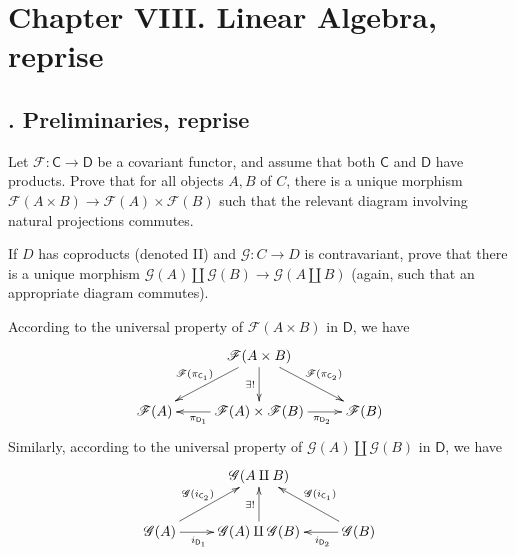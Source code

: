 \section{Chapter VIII.\hspace{0.2em} Linear Algebra, reprise}
\subsection{. Preliminaries, reprise}
\begin{problem}[1.1]
Let $\mathscr{F}: \mathsf{C} \rightarrow \mathsf{D}$ be a covariant functor, and assume that both $\mathsf{C}$ and $\mathsf{D}$ have products. Prove that for all objects $A, B$ of $C$, there is a unique morphism $\mathscr{F}(A \times B) \rightarrow \mathscr{F}(A) \times \mathscr{F}(B)$ such that the relevant diagram involving natural projections commutes.

\hspace*{2em}If $D$ has coproducts (denoted II) and $\mathscr{G}: C \rightarrow D$ is contravariant, prove that there is a unique morphism $\mathscr{G}(A)\amalg\mathscr{G}(B) \rightarrow \mathscr{G}(A \amalg B)$ (again, such that an appropriate diagram commutes).
\end{problem}
\begin{solution}
	According to the universal property of $\mathscr{F}(A \times B)$ in $\mathsf{D}$, we have 
\[\xymatrix{
	&\mathscr{F}(A \times B)
	 \ar@{->}[d]_{\exists !}
	 \ar@{->}[rd]^{\mathscr{F}(\pi_{\mathsf{C}_2})}
	 \ar@{->}[ld]_{\mathscr{F}(\pi_{\mathsf{C}_1})}
	& \\
	 \mathscr{F}(A)
	&\mathscr{F}(A) \times \mathscr{F}(B)
	 \ar@{->}[l]^{\pi_{\mathsf{D}_1}\hspace{1.2em}}
	 \ar@{->}[r]_{\hspace{1.5em}\pi_{\mathsf{D}_2}}
	&\mathscr{F}(B)
}\]
Similarly, according to the universal property of $\mathscr{G}(A)\amalg\mathscr{G}(B)$ in $\mathsf{D}$, we have
\[\xymatrix{
	&\mathscr{G}(A \amalg B)        
	& \\
	 \mathscr{G}(A)
	 \ar@{->}[ru]^{\mathscr{G}(i_{\mathsf{C}_2})}
	 \ar@{->}[r]_{i_{\mathsf{D}_1}\hspace{1.5em}}
	&\mathscr{G}(A) \amalg \mathscr{G}(B)
	 \ar@{->}[u]^{\exists !}
	&\mathscr{G}(B)
	\ar@{->}[lu]_{\mathscr{G}(i_{\mathsf{C}_1})}
	\ar@{->}[l]^{\hspace{2em}i_{\mathsf{D}_2}}
}\]
\end{solution}

